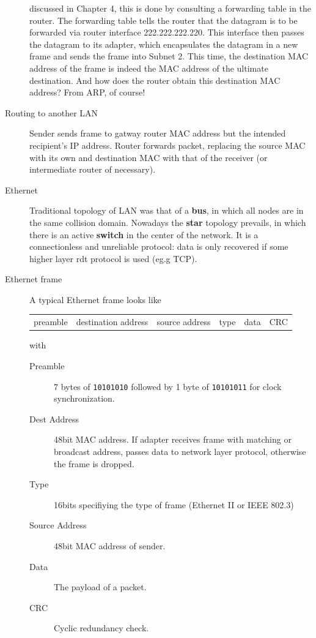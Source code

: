 \documentclass{article}
\begin{document}
\begin{description}
    discussed in Chapter 4, this is done by consulting a forwarding table in the router.
    The forwarding table tells the router that the datagram is to be forwarded via
    router interface 222.222.222.220. This interface then passes the datagram to its
    adapter, which encapsulates the datagram in a new frame and sends the frame
    into Subnet 2. This time, the destination MAC address of the frame is indeed the
    MAC address of the ultimate destination. And how does the router obtain this
    destination MAC address? From ARP, of course!
    \item[Routing to another LAN] Sender sends frame to gatway router MAC address but the intended
    recipient's IP address. Router forwards packet, replacing the source MAC with its own and
    destination MAC with that of the receiver (or intermediate router of necessary).
    \item[Ethernet] Traditional topology of LAN was that of a \textbf{bus}, in which all nodes are in 
    the same collision domain. Nowadays the \textbf{star} topology prevails, in which there is an active
    \textbf{switch} in the center of the network. It is a connectionless and unreliable protocol: data
    is only recovered if some higher layer rdt protocol is used (eg.g TCP).
    \item[Ethernet frame] A typical Ethernet frame looks like 
    
    \begin{tabular}[h!]{c|c|c|c|c|c}
    preamble & destination address & source address & type & data & CRC
    \end{tabular}
    
    with
    \begin{description}
        \item[Preamble] 7 bytes of \texttt{10101010} followed by 1 byte of \texttt{10101011} for clock
        synchronization.
        \item[Dest Address] 48bit MAC address. If adapter receives frame with matching or broadcast
        address, passes data to network layer protocol, otherwise the frame is dropped.
        \item[Type] 16bits specifiying the type of frame (Ethernet II or IEEE 802.3)
        \item[Source Address] 48bit MAC address of sender.
        \item[Data] The payload of a packet.
        \item[CRC] Cyclic redundancy check.
    \end{description}
    

\end{description}
\end{document}
